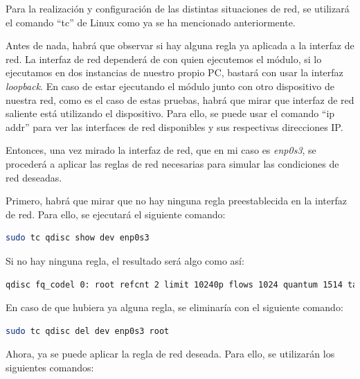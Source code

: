 \newpage

Para la realización y configuración de las distintas situaciones de red, se utilizará el comando ``tc'' de Linux como ya se ha mencionado anteriormente. 
\vspace{\baselineskip}

Antes de nada, habrá que observar si hay alguna regla ya aplicada a la interfaz de red. La interfaz de red dependerá de con quien ejecutemos el módulo, si lo ejecutamos en dos instancias de nuestro propio PC, bastará con usar la interfaz \textit{loopback}. En caso de estar ejecutando el módulo junto con otro dispositivo de nuestra red, como es el caso de estas pruebas, habrá que mirar que interfaz de red saliente está utilizando el dispositivo. Para ello, se puede usar el comando ``ip addr'' para ver las interfaces de red disponibles y sus respectivas direcciones IP. 

\vspace{\baselineskip}
Entonces, una vez mirado la interfaz de red, que en mi caso es \textit{enp0s3}, se procederá a aplicar las reglas de red necesarias para simular las condiciones de red deseadas.

\vspace{\baselineskip}

Primero, habrá que mirar que no hay ninguna regla preestablecida en la interfaz de red. Para ello, se ejecutará el siguiente comando:
\begin{lstlisting}[language=bash]
sudo tc qdisc show dev enp0s3
\end{lstlisting}
Si no hay ninguna regla, el resultado será algo como así:
\begin{lstlisting}[language=bash, breaklines=true]
qdisc fq_codel 0: root refcnt 2 limit 10240p flows 1024 quantum 1514 target 5ms interval 100ms memory_limit 32Mb ecn drop_batch 64 
\end{lstlisting}

En caso de que hubiera ya alguna regla, se eliminaría con el siguiente comando:
\begin{lstlisting}[language=bash]
sudo tc qdisc del dev enp0s3 root
\end{lstlisting}

Ahora, ya se puede aplicar la regla de red deseada. Para ello, se utilizarán los siguientes comandos:

